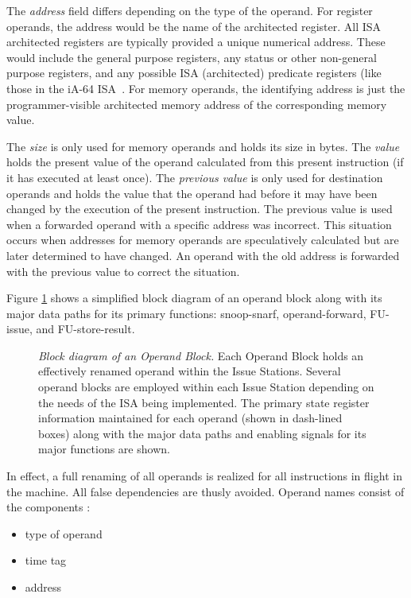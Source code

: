 \documentclass[10pt,twocolumn,dvips]{article}
\begin{document}
The \textit{address} field differs
depending on the type of the operand.
For register operands, the address would be
the name of the architected register.
All ISA architected registers are typically provided a
unique numerical address.  These would include the
general purpose registers, any status or other non-general
purpose registers, and any possible ISA (architected) predicate registers
(like those in the iA-64 ISA~\cite{intel99ia,schlansker00epic}.
For memory operands, the identifying address is just the
programmer-visible architected memory address of the corresponding
memory value.

The \textit{size} is only used for memory operands and holds
its size in bytes.
The \textit{value} holds the present value of the operand
calculated from this present instruction (if it has executed
at least once).
The \textit{previous value} is only used for destination
operands and holds the value that the operand
had before it may have been changed by the execution of 
the present instruction.
The previous value is used 
when a forwarded operand with a specific
address was incorrect.
This situation occurs when addresses for memory operands are
speculatively calculated but are later determined to have changed.
An operand with the old address is forwarded with the previous
value to correct the situation.

Figure \ref{fig:operand} shows a simplified block diagram of
an operand block along with its major data paths for its
primary functions: snoop-snarf, operand-forward, FU-issue,
and FU-store-result.
%
\begin{figure}
\scriptsize {
}
\caption{{\em Block diagram of an Operand Block.} 
Each Operand Block holds an effectively renamed 
operand within the Issue Stations.
Several operand blocks are employed within each Issue Station
depending on the needs of the ISA being implemented.
The primary state register information maintained for each operand (shown in
dash-lined boxes)
along with the major data paths and enabling signals for
its major functions are shown.}
\label{fig:operand}
\end{figure}
%

In effect, a full renaming of
all operands is realized for all instructions
in flight in the machine.  
All false dependencies are thusly avoided.
Operand names consist of the components :
%
\begin{itemize}
\vspace{-0.10in}
\item{type of operand}
\vspace{-0.10in}
\item{time tag}
\vspace{-0.10in}
\item{address}
\vspace{-0.10in}
\end{itemize}   
%
%
%
\end{document}
